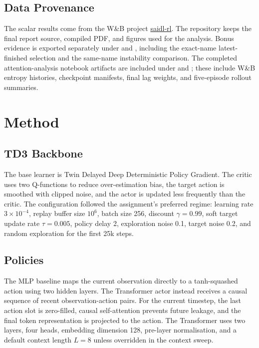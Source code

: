 \documentclass[11pt]{article}
\begin{document}
\subsection{Data Provenance}

The scalar results come from the W\&B project \href{https://wandb.ai/krishsachdev246-bits-pilani/saidl-rl}{saidl-rl}. The repository keeps the final report source, compiled PDF, and figures used for the analysis. Bonus evidence is exported separately under  and , including the exact-name latest-finished selection and the same-name instability comparison. The completed attention-analysis notebook artifacts are included under  and ; these include W\&B entropy histories, checkpoint manifests, final lag weights, and five-episode rollout summaries.

\section{Method}

\subsection{TD3 Backbone}

The base learner is Twin Delayed Deep Deterministic Policy Gradient. The critic uses two Q-functions to reduce over-estimation bias, the target action is smoothed with clipped noise, and the actor is updated less frequently than the critic. The configuration followed the assignment's preferred regime: learning rate $3 \times 10^{-4}$, replay buffer size $10^6$, batch size 256, discount $\gamma=0.99$, soft target update rate $\tau=0.005$, policy delay 2, exploration noise 0.1, target noise 0.2, and random exploration for the first 25k steps.

\subsection{Policies}

The MLP baseline maps the current observation directly to a tanh-squashed action using two hidden layers. The Transformer actor instead receives a causal sequence of recent observation-action pairs. For the current timestep, the last action slot is zero-filled, causal self-attention prevents future leakage, and the final token representation is projected to the action. The Transformer uses two layers, four heads, embedding dimension 128, pre-layer normalisation, and a default context length $L=8$ unless overridden in the context sweep.
\end{document}
